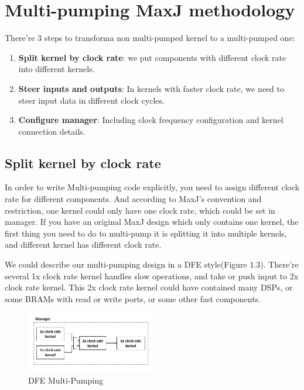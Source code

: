 \documentclass[a4paper, 10pt]{report}
\begin{document}
\section{Multi-pumping MaxJ methodology}
There're 3 steps to transforma non multi-pumped kernel to a multi-pumped one:
\begin{enumerate}
\item \textbf{Split kernel by clock rate}: we put components with different clock rate into different kernels.
\item \textbf{Steer inputs and outputs}: In kernels with faster clock rate, we need to steer input data in different clock cycles.
\item \textbf{Configure manager}: Including clock frequency configuration and kernel connection details.
\end{enumerate}

\subsection{Split kernel by clock rate}
In order to write Multi-pumping code explicitly, you need to assign different clock rate for different components. And according to MaxJ's convention and restriction, one kernel could only have one clock rate, which could be set in manager. If you have an original MaxJ design which only contains one kernel, the first thing you need to do to multi-pump it is splitting it into multiple kernels, and different kernel has different clock rate.

We could describe our multi-pumping design in a DFE style(Figure 1.3). There're several 1x clock rate kernel handles slow operations, and take or push input to 2x clock rate kernel. This 2x clock rate kernel could have contained many DSPs, or some BRAMs with read or write ports, or some other fast components.

\begin{figure}[h!]
  \caption{DFE Multi-Pumping}
  \centering
    \includegraphics[width=0.5\textwidth]{dfe-mp-wireframe}
\end{figure}
\end{document}
